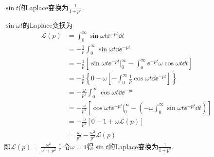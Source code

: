 {\begin{exercise}
    $\sin{t}$的Laplace变换为\underline{$\frac{1}{1+p^2}$}.
\end{exercise}
\begin{solution}
$\sin{\omega t}$的Laplace变换为
$$
\begin{aligned}
    \mathcal{L}\left(p\right)&=\int_0^{\infty}{\sin{\omega t}\ee^{-pt}\dd t}\\
    &=-\frac{1}{p}\int_0^{\infty}{\sin{\omega t\dd\ee^{-pt}}}\\
    &=-\frac{1}{p}\left[\sin{\omega t}\ee^{-pt}\Bigg|_0^{\infty}-\int_0^{\infty}{\ee^{-pt}\omega\cos{\omega t}\dd t}\right]\\
    &=-\frac{1}{p}\left\{0-\omega\left[-\int_0^{\infty}{\frac{1}{p}\cos{\omega t}\dd\ee^{-pt}}\right]\right\}\\
    &=-\frac{\omega}{p^2}\int_0^{\infty}{\cos{\omega t}\dd\ee^{-pt}}\\
    &=-\frac{\omega}{p^2}\left[\cos{\omega t}\ee^{-pt}\Bigg|_0^{\infty}-\left(-\omega\int_0^{\infty}{\sin{\omega t}\ee^{-pt}\dd t}\right)\right]\\
    &=-\frac{\omega}{p^2}\left[0-1+\omega \mathcal{L}\left(p\right)\right]\\
    &=\frac{\omega}{p^2}-\frac{\omega^2}{p^2}\mathcal{L}\left(p\right)
\end{aligned}
$$
即$\mathcal{L}\left(p\right)=\frac{\omega^2}{\omega^2+p^2}$；令$\omega=1$得$\sin{t}$的Laplace变换为$\frac{1}{1+p^2}$.

\end{solution}
}

